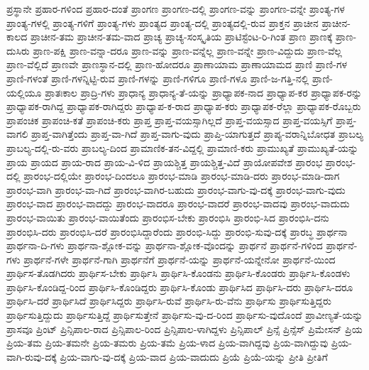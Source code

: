 {ಪ್ರಸ್ಥಾನೇ
ಪ್ರಹಾರ-ಗಳಿಂದ
ಪ್ರಹಾರ-ದಂತೆ
ಪ್ರಾಂಗಣ
ಪ್ರಾಂಗಣ-ದಲ್ಲಿ
ಪ್ರಾಂಗಣ-ವನ್ನು
ಪ್ರಾಂಗಣ-ವನ್ನೇ
ಪ್ರಾಂತ್ಯ-ಗಳ
ಪ್ರಾಂತ್ಯ-ಗಳಲ್ಲಿ
ಪ್ರಾಂತ್ಯ-ಗಳಿಗೆ
ಪ್ರಾಂತ್ಯ-ಗಳು
ಪ್ರಾಂತ್ಯದ
ಪ್ರಾಂತ್ಯ-ದಲ್ಲಿ
ಪ್ರಾಂತ್ಯದಲ್ಲಿ-ರುವ
ಪ್ರಾಕ್ತನ
ಪ್ರಾಚೀನ
ಪ್ರಾಚೀನ-ಕಾಲದ
ಪ್ರಾಚೀನ-ತಮ
ಪ್ರಾಚೀನ-ತಮ-ವಾದ
ಪ್ರಾಚ್ಯ
ಪ್ರಾಚ್ಯ-ಸಂಸ್ಕೃತಿಯ
ಪ್ರಾಟಿಸ್ಟೆಂಟ-ರಿ-ಗಿಂತ
ಪ್ರಾಣ
ಪ್ರಾಣಕ್ಕೆ
ಪ್ರಾಣ-ದುಸಿರು
ಪ್ರಾಣ-ಪಕ್ಷಿ
ಪ್ರಾಣ-ವನ್ನಾ-ದರೂ
ಪ್ರಾಣ-ವನ್ನು
ಪ್ರಾಣ-ವನ್ನೆಲ್ಲ
ಪ್ರಾಣ-ವನ್ನೇ
ಪ್ರಾಣ-ವಿದ್ದುದು
ಪ್ರಾಣ-ವೆಲ್ಲ
ಪ್ರಾಣ-ವೆಲ್ಲಿದೆ
ಪ್ರಾಣವೇ
ಪ್ರಾಣಸ್ಥಾನ-ದಲ್ಲಿ
ಪ್ರಾಣ-ಹೋದರೂ
ಪ್ರಾಣಾಯಾಮ
ಪ್ರಾಣಾಯಾಮದ
ಪ್ರಾಣಿ
ಪ್ರಾಣಿ-ಗಳ
ಪ್ರಾಣಿ-ಗಳಂತೆ
ಪ್ರಾಣಿ-ಗಳನ್ನಿಟ್ಟಿ-ರುವ
ಪ್ರಾಣಿ-ಗಳನ್ನು
ಪ್ರಾಣಿ-ಗಳಿಗೂ
ಪ್ರಾಣಿ-ಗಳೂ
ಪ್ರಾಣಿ-ಜ-ಗತ್ತಿ-ನಲ್ಲಿ
ಪ್ರಾಣಿ-ಯಲ್ಲಿಯೂ
ಪ್ರಾತಃಕಾಲ
ಪ್ರಾದ್ರಿ-ಗಳು
ಪ್ರಾಧಾನ್ಯ
ಪ್ರಾಧಾನ್ಯ-ತೆ-ಯನ್ನು
ಪ್ರಾಧ್ಯಾಪಕ-ನಾದ
ಪ್ರಾಧ್ಯಾಪ-ಕರ
ಪ್ರಾಧ್ಯಾಪಕ-ರನ್ನು
ಪ್ರಾಧ್ಯಾಪಕ-ರಾಗಿದ್ದ
ಪ್ರಾಧ್ಯಾಪಕ-ರಾಗಿದ್ದರು
ಪ್ರಾಧ್ಯಾಪ-ಕ-ರಾದ
ಪ್ರಾಧ್ಯಾಪ-ಕರು
ಪ್ರಾಧ್ಯಾಪಕ-ರೆಲ್ಲಾ
ಪ್ರಾಧ್ಯಾಪಕ-ರೊಬ್ಬರು
ಪ್ರಾಪಂಚಿಕ
ಪ್ರಾಪಂಚಿ-ಕತೆ
ಪ್ರಾಪಂಚಿ-ಕರು
ಪ್ರಾಪ್ತ
ಪ್ರಾಪ್ತ-ವಯಸ್ಸಾಗಿಲ್ಲದೆ
ಪ್ರಾಪ್ತ-ವಯಸ್ಸಾದ
ಪ್ರಾಪ್ತ-ವಯಸ್ಸಿಗೆ
ಪ್ರಾಪ್ತ-ವಾಗಲಿ
ಪ್ರಾಪ್ತ-ವಾಗಿತ್ತೆಂದು
ಪ್ರಾಪ್ತ-ವಾ-ಗಿದೆ
ಪ್ರಾಪ್ತ-ವಾಗು-ವುದು
ಪ್ರಾಪ್ತಿ-ಯಾಗುತ್ತದೆ
ಪ್ರಾಪ್ಯ-ವರಾನ್ನಿಬೋಧತ
ಪ್ರಾಬಲ್ಯ
ಪ್ರಾಬಲ್ಯ-ದಲ್ಲಿ-ರು-ವರು
ಪ್ರಾಬಲ್ಯ-ದಿಂದ
ಪ್ರಾಮಾಣಿಕ-ತನ-ವಿದ್ದಲ್ಲಿ
ಪ್ರಾಮಾಣಿ-ಕರು
ಪ್ರಾಮುಖ್ಯತೆ
ಪ್ರಾಮುಖ್ಯತೆ-ಯನ್ನು
ಪ್ರಾಯ
ಪ್ರಾಯದ
ಪ್ರಾಯ-ರಾದ
ಪ್ರಾಯ-ವಿ-ಳಿದ
ಪ್ರಾಯಶ್ಚಿತ್ತ
ಪ್ರಾಯಶ್ಚಿತ್ತ-ವಿದೆ
ಪ್ರಾಯೋಪವೇಶ
ಪ್ರಾರಂಭ
ಪ್ರಾರಂಭ-ದಲ್ಲಿ
ಪ್ರಾರಂಭ-ದಲ್ಲಿಯೇ
ಪ್ರಾರಂಭ-ದಿಂದಲೂ
ಪ್ರಾರಂಭ-ಮಾಡಿ
ಪ್ರಾರಂಭ-ಮಾಡಿ-ದರು
ಪ್ರಾರಂಭ-ಮಾಡಿ-ದಾಗ
ಪ್ರಾರಂಭ-ವಾಗಿ
ಪ್ರಾರಂಭ-ವಾ-ಗಿದೆ
ಪ್ರಾರಂಭ-ವಾಗಿರ-ಬಹುದು
ಪ್ರಾರಂಭ-ವಾಗು-ವು-ದಕ್ಕೆ
ಪ್ರಾರಂಭ-ವಾಗು-ವುದು
ಪ್ರಾರಂಭ-ವಾದ
ಪ್ರಾರಂಭ-ವಾದದ್ದು
ಪ್ರಾರಂಭ-ವಾದರೂ
ಪ್ರಾರಂಭ-ವಾದರೆ
ಪ್ರಾರಂಭ-ವಾದವು
ಪ್ರಾರಂಭ-ವಾದುದು
ಪ್ರಾರಂಭ-ವಾಯಿತು
ಪ್ರಾರಂಭ-ವಾಯಿತೆಂದು
ಪ್ರಾರಂಭಿಸ-ಬೇಕು
ಪ್ರಾರಂಭಿಸಿ
ಪ್ರಾರಂಭಿ-ಸಿದ
ಪ್ರಾರಂಭಿಸಿ-ದನು
ಪ್ರಾರಂಭಿಸಿ-ದರು
ಪ್ರಾರಂಭಿಸಿ-ದರೆ
ಪ್ರಾರಂಭಿಸಿದ್ದಾರೆಂದು
ಪ್ರಾರಂಭಿ-ಸಿದ್ದು
ಪ್ರಾರಂಭಿ-ಸುವು-ದಕ್ಕೆ
ಪ್ರಾರಬ್ಧ
ಪ್ರಾರ್ಥನಾ
ಪ್ರಾರ್ಥನಾ-ದಿ-ಗಳು
ಪ್ರಾರ್ಥನಾ-ಶ್ಲೋಕ-ವನ್ನು
ಪ್ರಾರ್ಥನಾ-ಶ್ಲೋಕ-ವೊಂದನ್ನು
ಪ್ರಾರ್ಥನೆ
ಪ್ರಾರ್ಥನೆ-ಗಳಿಂದ
ಪ್ರಾರ್ಥನೆ-ಗಳು
ಪ್ರಾರ್ಥನೆ-ಗಳೇ
ಪ್ರಾರ್ಥನೆ-ಗಾಗಿ
ಪ್ರಾರ್ಥನೆಗೆ
ಪ್ರಾರ್ಥನೆ-ಯನ್ನು
ಪ್ರಾರ್ಥನೆ-ಯನ್ನೇನೋ
ಪ್ರಾರ್ಥನೆ-ಯಿಂದ
ಪ್ರಾರ್ಥಿಸ-ತೊಡಗಿದರು
ಪ್ರಾರ್ಥಿಸ-ಬೇಕು
ಪ್ರಾರ್ಥಿಸಿ
ಪ್ರಾರ್ಥಿಸಿ-ಕೊಂಡನು
ಪ್ರಾರ್ಥಿಸಿ-ಕೊಂಡರು
ಪ್ರಾರ್ಥಿಸಿ-ಕೊಂಡಳು
ಪ್ರಾರ್ಥಿಸಿ-ಕೊಂಡಿದ್ದ-ರಿಂದ
ಪ್ರಾರ್ಥಿಸಿ-ಕೊಂಡಿದ್ದರು
ಪ್ರಾರ್ಥಿಸಿ-ಕೊಂಡು
ಪ್ರಾರ್ಥಿಸಿದ
ಪ್ರಾರ್ಥಿಸಿ-ದರು
ಪ್ರಾರ್ಥಿಸಿ-ದರೂ
ಪ್ರಾರ್ಥಿಸಿ-ದರೆ
ಪ್ರಾರ್ಥಿಸಿದೆ
ಪ್ರಾರ್ಥಿಸಿದ್ದರು
ಪ್ರಾರ್ಥಿಸಿ-ರುವೆ
ಪ್ರಾರ್ಥಿಸಿ-ರು-ವೆನು
ಪ್ರಾರ್ಥಿಸು
ಪ್ರಾರ್ಥಿಸುತ್ತಿದ್ದರು
ಪ್ರಾರ್ಥಿಸುತ್ತಿದ್ದುದು
ಪ್ರಾರ್ಥಿಸುತ್ತಿದ್ದೆ
ಪ್ರಾರ್ಥಿಸುತ್ತೇನೆ
ಪ್ರಾರ್ಥಿಸು-ವು-ದ-ರಿಂದ
ಪ್ರಾರ್ಥಿಸು-ವುದೊಂದೆ
ಪ್ರಾವೀಣ್ಯತೆ-ಯನ್ನು
ಪ್ರಾಸವೂ
ಪ್ರಿಂಟ್
ಪ್ರಿನ್ಸಿಪಾಲ-ರಾದ
ಪ್ರಿನ್ಸಿಪಾಲ-ರಿಂದ
ಪ್ರಿನ್ಸಿಪಾಲ-ಳಾಗಿದ್ದಳು
ಪ್ರಿನ್ಸಿಪಾಲ್
ಪ್ರಿನ್ಸೆ
ಪ್ರಿನ್ಸೆಸ್
ಪ್ರಿಮೇಸನ್
ಪ್ರಿಯ
ಪ್ರಿಯ-ತಮ
ಪ್ರಿಯ-ತಮನೇ
ಪ್ರಿಯ-ತಮರು
ಪ್ರಿಯ-ತಮೆ
ಪ್ರಿಯ-ಳಾದ
ಪ್ರಿಯ-ವಾಗಿದ್ದವು
ಪ್ರಿಯ-ವಾಗಿದ್ದುವು
ಪ್ರಿಯ-ವಾಗಿ-ರುವು-ದಕ್ಕೆ
ಪ್ರಿಯ-ವಾಗು-ವು-ದಕ್ಕೆ
ಪ್ರಿಯ-ವಾದ
ಪ್ರಿಯ-ವಾದುದು
ಪ್ರಿಯೆ
ಪ್ರಿಯೆ-ಯನ್ನು
ಪ್ರೀತಿ
ಪ್ರೀತಿಗೆ
}
